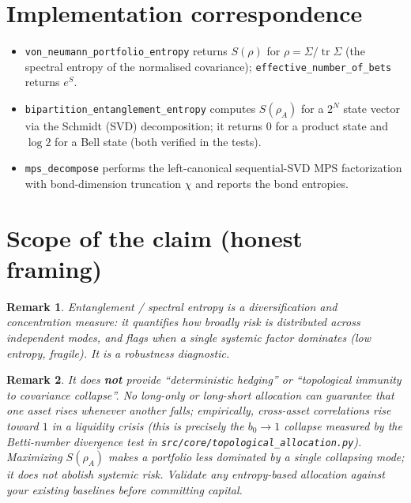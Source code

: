 \documentclass[11pt]{article}
\newtheorem{remark}{Remark}
\begin{document}
\section*{Implementation correspondence}

\begin{itemize}
\item \texttt{von\_neumann\_portfolio\_entropy} returns
$S(\rho)$ for $\rho = \Sigma/\operatorname{tr}\Sigma$ (the spectral entropy of the
normalised covariance); \texttt{effective\_number\_of\_bets} returns $e^{S}$.
\item \texttt{bipartition\_entanglement\_entropy} computes $S(\rho_A)$ for a
$2^N$ state vector via the Schmidt (SVD) decomposition; it returns $0$ for a
product state and $\log 2$ for a Bell state (both verified in the tests).
\item \texttt{mps\_decompose} performs the left-canonical sequential-SVD MPS
factorization with bond-dimension truncation $\chi$ and reports the bond
entropies.
\end{itemize}

\section*{Scope of the claim (honest framing)}

\begin{remark}
Entanglement / spectral entropy is a \emph{diversification and concentration}
measure: it quantifies how broadly risk is distributed across independent modes,
and flags when a single systemic factor dominates (low entropy, fragile). It is a
robustness \emph{diagnostic}.
\end{remark}

\begin{remark}
It does \textbf{not} provide ``deterministic hedging'' or ``topological
immunity to covariance collapse''. No long-only or long-short allocation can
guarantee that one asset rises whenever another falls; empirically, cross-asset
correlations rise toward $1$ in a liquidity crisis (this is precisely the
$b_0 \to 1$ collapse measured by the Betti-number divergence test in
\texttt{src/core/topological\_allocation.py}). Maximizing $S(\rho_A)$ makes a
portfolio \emph{less dominated} by a single collapsing mode; it does not abolish
systemic risk. Validate any entropy-based allocation against your existing
baselines before committing capital.
\end{remark}
\end{document}
